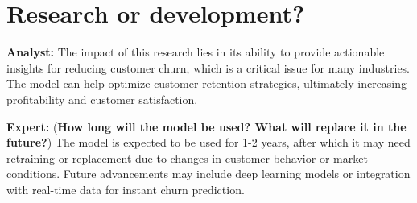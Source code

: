 \documentclass[12pt]{article}
\begin{document}
\section{Research or development?}

\textbf{Analyst:} The impact of this research lies in its ability to provide actionable insights for reducing customer churn, which is a critical issue for many industries. The model can help optimize customer retention strategies, ultimately increasing profitability and customer satisfaction.

\textbf{Expert:} (\textbf{How long will the model be used? What will replace it in the future?}) The model is expected to be used for 1-2 years, after which it may need retraining or replacement due to changes in customer behavior or market conditions. Future advancements may include deep learning models or integration with real-time data for instant churn prediction.
\end{document}
